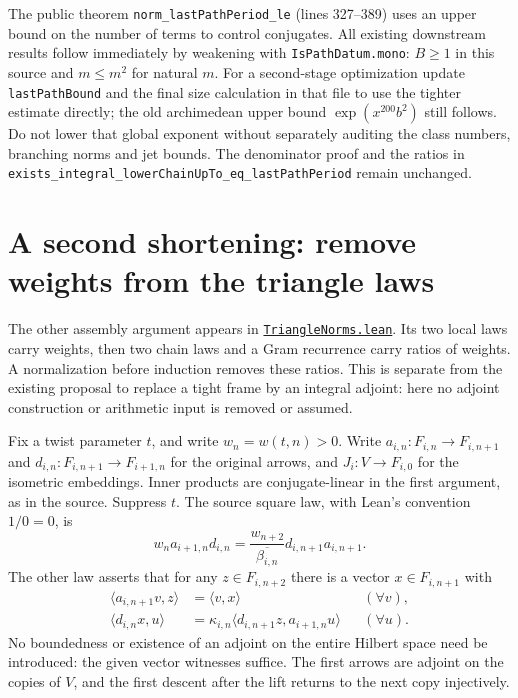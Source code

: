 \documentclass[11pt]{article}
\newcommand{\inn}[2]{\langle #1,#2\rangle}
\newcommand{\src}[2]{\href{https://github.com/VladimirReshetnikov/ProveIt/blob/main/Analysis/GeneralizedRiemannHypothesis/Lean/grh/src/#1}{#2}}
\newcommand{\code}[1]{\texttt{#1}}
\begin{document}
The public theorem \code{norm\_lastPathPeriod\_le} (lines 327--389) uses an upper bound on the number of terms to control conjugates. All existing downstream results follow immediately by weakening with \code{IsPathDatum.mono}: $B\ge1$ in this source and $m\le m^2$ for natural $m$. For a second-stage optimization update \code{lastPathBound} and the final size calculation in that file to use the tighter estimate directly; the old archimedean upper bound $\exp(x^{200}b^2)$ still follows. Do not lower that global exponent without separately auditing the class numbers, branching norms and jet bounds. The denominator proof and the ratios in \code{exists\_integral\_lowerChainUpTo\_eq\_lastPathPeriod} remain unchanged.

\section{A second shortening: remove weights from the triangle laws}\label{sec:triangle}
The other assembly argument appears in \src{New/Determinant/Chain/TriangleNorms.lean}{\code{TriangleNorms.lean}}. Its two local laws carry weights, then two chain laws and a Gram recurrence carry ratios of weights. A normalization before induction removes these ratios. This is separate from the existing proposal to replace a tight frame by an integral adjoint: here no adjoint construction or arithmetic input is removed or assumed.

Fix a twist parameter $t$, and write $w_n=w(t,n)>0$. Write $a_{i,n}:F_{i,n}\to F_{i,n+1}$ and $d_{i,n}:F_{i,n+1}\to F_{i+1,n}$ for the original arrows, and $J_i:V\to F_{i,0}$ for the isometric embeddings. Inner products are conjugate-linear in the first argument, as in the source. Suppress $t$. The source square law, with Lean's convention $1/0=0$, is
\begin{equation}\label{eq:origcomm}
 w_n a_{i+1,n}d_{i,n}=\frac{w_{n+2}}{\overline{\beta_{i,n}}}d_{i,n+1}a_{i,n+1}.
\end{equation}
The other law asserts that for any $z\in F_{i,n+2}$ there is a vector $x\in F_{i,n+1}$ with
\begin{align}
 \inn{a_{i,n+1}v}{z}&=\inn{v}{x} &&(\forall v),\label{eq:origadj1}\\
 \inn{d_{i,n}x}{u}&=\kappa_{i,n}\inn{d_{i,n+1}z}{a_{i+1,n}u} &&(\forall u).\label{eq:origadj2}
\end{align}
No boundedness or existence of an adjoint on the entire Hilbert space need be introduced: the given vector witnesses suffice. The first arrows are adjoint on the copies of $V$, and the first descent after the lift returns to the next copy injectively.
\end{document}
